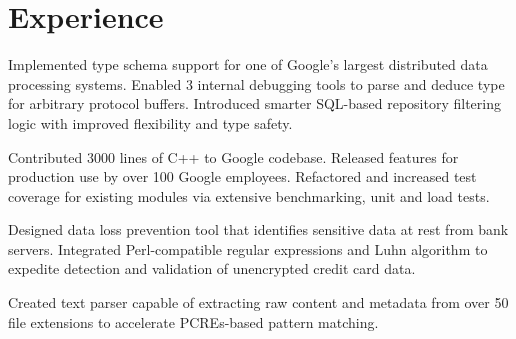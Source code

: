 \documentclass[letterpaper]{deedy-resume} %
\begin{document}
\hfill
%
%
\begin{minipage}[t]{0.66\textwidth} %


\section{Experience}


\vspace{\topsep} %
\begin{tightitemize}
\item Implemented type schema support for one of Google's largest distributed data processing systems. Enabled 3 internal debugging tools to parse and deduce type for arbitrary protocol buffers. Introduced smarter SQL-based repository filtering logic with improved flexibility and type safety. 
\item Contributed 3000 lines of C++ to Google codebase. Released features for production use by over 100 Google employees. Refactored and increased test coverage for existing modules via extensive benchmarking, unit and load tests.
\end{tightitemize}

\sectionspace %



\begin{tightitemize}
\item Designed data loss prevention tool that identifies sensitive data at rest from bank servers. Integrated Perl-compatible regular expressions and Luhn algorithm to expedite detection and validation of unencrypted credit card data.
\item Created text parser capable of extracting raw content and metadata from over 50 file extensions to accelerate PCREs-based pattern matching.
\end{tightitemize}


\end{minipage}
\end{document}
